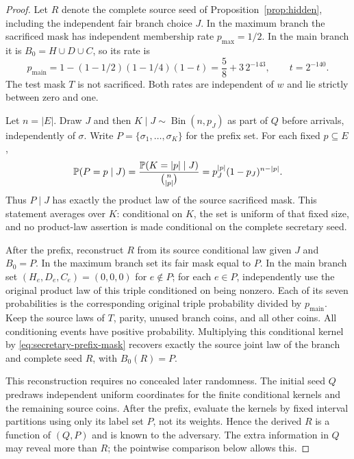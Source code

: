 \begin{proof}
Let $R$ denote the complete source seed of Proposition~\ref{prop:hidden},
including the independent fair branch choice $J$. In the maximum branch the sacrificed
mask has independent membership rate $p_{\mathrm{max}}=1/2$. In the main
branch it is $B_0=H\cup D\cup C$, so its rate is
\[
 p_{\mathrm{main}}
 =1-(1-1/2)(1-1/4)(1-t)
 =\frac58+3\,2^{-143},
 \qquad t=2^{-140}.
\]
The test mask $T$ is not sacrificed. Both rates are independent of $w$
and lie strictly between zero and one.

Let $n=|E|$. Draw $J$ and then
$K\mid J\sim\operatorname{Bin}(n,p_J)$ as part of $Q$ before arrivals,
independently of $\sigma$. Write $P=\{\sigma_1,\ldots,\sigma_K\}$ for the
prefix set. For each fixed $p\subseteq E$,
\begin{equation}\label{eq:secretary-prefix-mask}
 \mathbb P(P=p\mid J)
 =\frac{\mathbb P(K=|p|\mid J)}{\binom n{|p|}}
 =p_J^{|p|}(1-p_J)^{n-|p|}.
\end{equation}
Thus $P\mid J$ has exactly the product law of the source sacrificed mask.
This statement averages over $K$: conditional on $K$, the set is uniform
of that fixed size, and no product-law assertion is made conditional on
the complete secretary seed.

After the prefix, reconstruct $R$ from its source conditional law given
$J$ and $B_0=P$. In the maximum branch set its fair mask equal to $P$.
In the main branch set $(H_e,D_e,C_e)=(0,0,0)$ for $e\notin P$; for each
$e\in P$, independently use the original product law of this triple
conditioned on being nonzero. Each of its seven probabilities is the
corresponding original triple probability divided by $p_{\mathrm{main}}$.
Keep the source laws of $T$, parity, unused branch coins, and all other
coins. All conditioning events have positive probability. Multiplying
this conditional kernel by \eqref{eq:secretary-prefix-mask} recovers
exactly the source joint law of the branch and complete seed $R$, with
$B_0(R)=P$.

This reconstruction requires no concealed later randomness. The initial
seed $Q$ predraws independent uniform coordinates for the finite
conditional kernels and the remaining source coins. After the prefix,
evaluate the kernels by fixed interval partitions using only its label set
$P$, not its weights. Hence the derived $R$ is a function of $(Q,P)$ and
is known to the adversary. The extra information in $Q$ may reveal more
than $R$; the pointwise comparison below allows this.


\end{proof}
